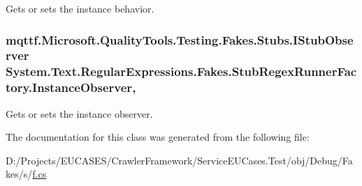 Gets or sets the instance behavior.

\hypertarget{class_system_1_1_text_1_1_regular_expressions_1_1_fakes_1_1_stub_regex_runner_factory_aa2a4e9f49b07cf0f9312f82ee272a59c}{
\subsubsection[{Instance\-Observer}]{\setlength{\rightskip}{0pt plus 5cm}mqttf.\-Microsoft.\-Quality\-Tools.\-Testing.\-Fakes.\-Stubs.\-I\-Stub\-Observer System.\-Text.\-Regular\-Expressions.\-Fakes.\-Stub\-Regex\-Runner\-Factory.\-Instance\-Observer\hspace{0.3cm}{\ttfamily [get]}, {\ttfamily [set]}}}\label{class_system_1_1_text_1_1_regular_expressions_1_1_fakes_1_1_stub_regex_runner_factory_aa2a4e9f49b07cf0f9312f82ee272a59c}


Gets or sets the instance observer.



The documentation for this class was generated from the following file\-:\begin{DoxyCompactItemize}
\item 
D\-:/\-Projects/\-E\-U\-C\-A\-S\-E\-S/\-Crawler\-Framework/\-Service\-E\-U\-Cases.\-Test/obj/\-Debug/\-Fakes/s/\hyperlink{s_2f_8cs}{f.\-cs}\end{DoxyCompactItemize}
